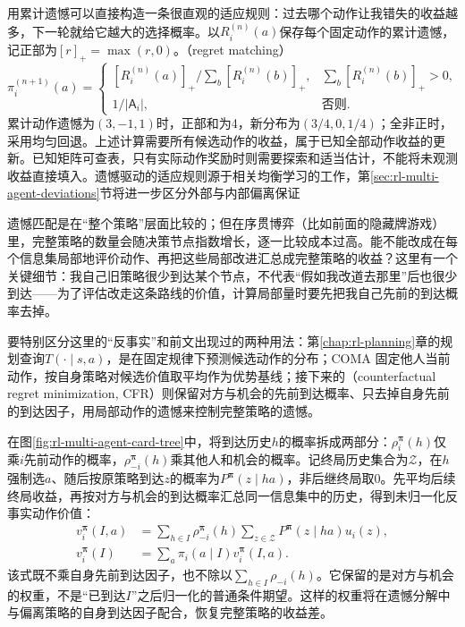 用累计遗憾可以直接构造一条很直观的适应规则：过去哪个动作让我错失的收益越多，下一轮就给它越大的选择概率。以$R_i^{(n)}(a)$保存每个固定动作的累计遗憾，记正部为$[r]_+=\max(r,0)$。（regret matching）
\[
 \pi_i^{(n+1)}(a)=
 \begin{cases}
 [R_i^{(n)}(a)]_+/\sum_b[R_i^{(n)}(b)]_+,
       &\sum_b[R_i^{(n)}(b)]_+>0,\\
 1/|\mathsf A_i|,&\text{否则}.
 \end{cases}
\]
累计动作遗憾为$(3,-1,1)$时，正部和为4，新分布为$(3/4,0,1/4)$；全非正时，采用均匀回退。上述计算需要所有候选动作的收益，属于已知全部动作收益的更新。已知矩阵可查表，只有实际动作奖励时则需要探索和适当估计，不能将未观测收益直接填入。遗憾驱动的适应规则源于相关均衡学习的工作，第\ref{sec:rl-multi-agent-deviations}节将进一步区分外部与内部偏离保证

遗憾匹配是在“整个策略”层面比较的；但在序贯博弈（比如前面的隐藏牌游戏）里，完整策略的数量会随决策节点指数增长，逐一比较成本过高。能不能改成在每个信息集局部地评价动作、再把这些局部改进汇总成完整策略的收益？这里有一个关键细节：我自己旧策略很少到达某个节点，不代表“假如我改道去那里”后也很少到达——为了评估改走这条路线的价值，计算局部量时要先把我自己先前的到达概率去掉。

要特别区分这里的“反事实”和前文出现过的两种用法：第\ref{chap:rl-planning}章的规划查询$T(\cdot\mid s,a)$，是在固定规律下预测候选动作的分布；COMA 固定他人当前动作，按自身策略对候选价值取平均作为优势基线；接下来的（counterfactual regret minimization, CFR）则保留对方与机会的先前到达概率、只去掉自身先前的到达因子，用局部动作的遗憾来控制完整策略的遗憾。

在图\ref{fig:rl-multi-agent-card-tree}中，将到达历史$h$的概率拆成两部分：$\rho_i^{\bm\pi}(h)$仅乘$i$先前动作的概率，$\rho_{-i}^{\bm\pi}(h)$乘其他人和机会的概率。记终局历史集合为$\mathcal Z$，在$h$强制选$a$、随后按原策略到达$z$的概率为$P^{\bm\pi}(z\mid ha)$，非后继终局取0。先平均后续终局收益，再按对方与机会的到达概率汇总同一信息集中的历史，得到未归一化反事实动作价值：
\begin{align}
 v_i^{\bm\pi}(I,a)
 &=\sum_{h\in I}\rho_{-i}^{\bm\pi}(h)
         \sum_{z\in\mathcal Z}P^{\bm\pi}(z\mid ha)u_i(z),\\
 v_i^{\bm\pi}(I)&=\sum_a\pi_i(a\mid I)v_i^{\bm\pi}(I,a).
 \label{eq:rl-multi-agent-cfr-value}
\end{align}
该式既不乘自身先前到达因子，也不除以$\sum_{h\in I}\rho_{-i}(h)$。它保留的是对方与机会的权重，不是“已到达$I$”之后归一化的普通条件期望。这样的权重将在遗憾分解中与偏离策略的自身到达因子配合，恢复完整策略的收益差。

